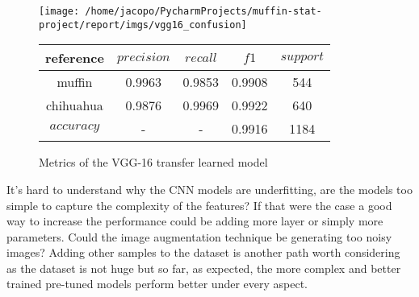 \begin{figure}
    \centering
    \texttt{[image: /home/jacopo/PycharmProjects/muffin-stat-project/report/imgs/vgg16\_confusion]}
    \centering

    \begin{tabular}{ c | c | c | c| c}
        \hline
        reference  & $precision$ & $recall$ & $f1$   & $support$ \\
        \hline\hline
        muffin     & 0.9963      & 0.9853   & 0.9908 & 544       \\
        \hline
        chihuahua  & 0.9876      & 0.9969   & 0.9922 & 640       \\
        \hline
        $accuracy$ & -           & -        & 0.9916 & 1184      \\
        \hline
    \end{tabular}

    \caption{
        Metrics of the VGG-16 transfer learned model
    }\label{fig:figure6}
\end{figure}


It's hard to understand why the CNN models are underfitting, are the models too simple to capture the complexity
of the features?
If that were the case a good way to increase the performance could be adding more layer or simply more parameters.
Could the image augmentation technique be generating too noisy images?
Adding other samples to the dataset is another path worth considering as the dataset is not huge but so far, as expected, the more complex
and better trained pre-tuned models perform better under every aspect.

